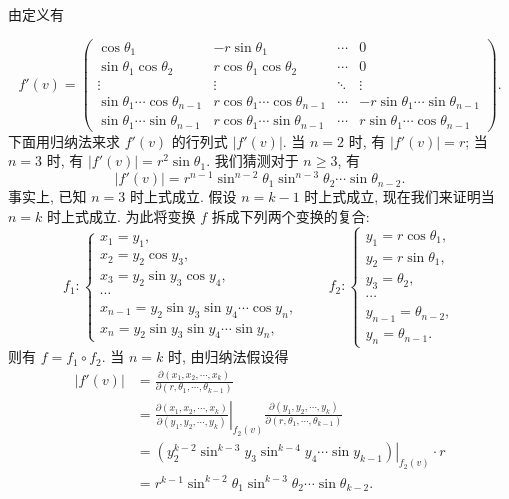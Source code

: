\documentclass[UTF8,12pt,a4paper,fontset=fandol]{ctexart}
\begin{document}
\begin{solve}\quad 由定义有

\[
  f'(v)=
  \begin{pmatrix}
    \cos\theta_1&-r\sin\theta_1&\cdots&0\\
    \sin\theta_1\cos\theta_2&r\cos\theta_1\cos\theta_2&\cdots&0\\
    \vdots&\vdots&\ddots&\vdots\\
    \sin\theta_1\cdots\cos\theta_{n-1}&r\cos\theta_1\cdots\cos\theta_{n-1}&\cdots&-r\sin\theta_1\cdots\sin\theta_{n-1}\\
    \sin\theta_1\cdots\sin\theta_{n-1}&r\cos\theta_1\cdots\sin\theta_{n-1}&\cdots&r\sin\theta_1\cdots\cos\theta_{n-1}
  \end{pmatrix}.
\]
下面用归纳法来求 $f'(v)$ 的行列式 $|f'(v)|$. 当 $n=2$ 时, 有 $|f'(v)|=r$; 当 $n=3$ 时, 有 $|f'(v)|=r^2\sin\theta_1$. 我们猜测对于 $n\geqslant3$, 有
\[
  |f'(v)|=r^{n-1}\sin^{n-2}\theta_1\sin^{n-3}\theta_2\cdots\sin\theta_{n-2}.
\]
事实上, 已知 $n=3$ 时上式成立. 假设 $n=k-1$ 时上式成立, 现在我们来证明当 $n=k$ 时上式成立. 为此将变换 $f$ 拆成下列两个变换的复合:
\[
  f_1:\begin{cases}
    x_1=y_1,\\
    x_2=y_2\cos y_3,\\
    x_3=y_2\sin y_3\cos y_4,\\
    \cdots\\
    x_{n-1}=y_2\sin y_3\sin y_4\cdots\cos y_n,\\
    x_n=y_2\sin y_3\sin y_4\cdots\sin y_n,
  \end{cases}
  \qquad
  f_2:\begin{cases}
    y_1=r\cos\theta_1,\\
    y_2=r\sin\theta_1,\\
    y_3=\theta_2,\\
    \cdots\\
    y_{n-1}=\theta_{n-2},\\
    y_n=\theta_{n-1}.
  \end{cases}
\]
则有 $f=f_1\circ f_2$. 当 $n=k$ 时, 由归纳法假设得
\[
\begin{aligned}
  |f'(v)|
  &=
  \frac{\partial(x_1,x_2,\cdots,x_k)}
  {\partial(r,\theta_1,\cdots,\theta_{k-1})}\\
  &=
  \left.
  \frac{\partial(x_1,x_2,\cdots,x_k)}
  {\partial(y_1,y_2,\cdots,y_k)}
  \right|_{f_2(v)}
  \frac{\partial(y_1,y_2,\cdots,y_k)}
  {\partial(r,\theta_1,\cdots,\theta_{k-1})}\\
  &=
  \left.(y_2^{k-2}\sin^{k-3}y_3\sin^{k-4}y_4\cdots\sin y_{k-1})\right|_{f_2(v)}
  \cdot r\\
  &=r^{k-1}\sin^{k-2}\theta_1\sin^{k-3}\theta_2\cdots\sin\theta_{k-2}.
\end{aligned}
\]

\end{solve}
\end{document}
